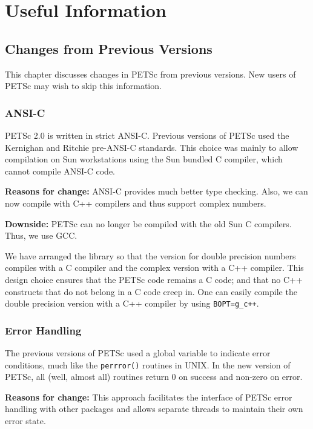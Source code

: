 \part{Useful Information}
\label{part:usefulstuff}
\chapter{Changes from Previous Versions} 
\label{ch:changes}

This chapter discusses changes in PETSc from previous versions. 
New users of PETSc may wish to skip this information.

\section{ANSI-C}

PETSc 2.0 is written in strict ANSI-C.  Previous versions of PETSc used 
the Kernighan and Ritchie pre-ANSI-C standards. This choice was mainly to 
allow compilation on Sun workstations using the Sun bundled C compiler, 
which cannot compile ANSI-C code. 

{\bf Reasons for change:}
ANSI-C provides much better type checking.  Also, we can now compile with 
C++ compilers and thus support complex numbers. 

{\bf Downside:} PETSc can no longer be compiled with the old Sun C 
compilers.  Thus, we use GCC.

We have arranged the library so that the version for double precision numbers
compiles with a C compiler and the complex version with a C++ compiler.
This design choice ensures that the PETSc code remains a C code; and 
that no C++ constructs that do not belong in a C code creep in.  One can
easily  compile the double precision version with a C++ 
compiler by using {\tt BOPT=g\_c++}. 


\section{Error Handling}

The previous versions of PETSc used a global variable to indicate 
error conditions, much like the {\tt perrror()} routines in UNIX. In the 
new version of PETSc, all (well, almost all) routines return 0 on success
and non-zero on error. 

{\bf Reasons for change:} This approach facilitates the interface of 
PETSc error handling with other packages and allows separate threads to 
maintain their own error state. 

